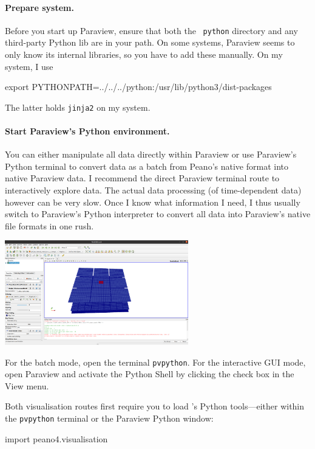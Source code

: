 \paragraph{Prepare system.}
%
%
Before you start up Paraview, ensure that both the \Peano\ \texttt{python}
directory and any third-party Python lib are in your path. 
On some systems, Paraview seems to
only know its internal libraries, so you have to add these manually. On my
system, I use
  \begin{code}
export PYTHONPATH=../../../python:/usr/lib/python3/dist-packages  
  \end{code}
The latter holds \texttt{jinja2} on my system.


\paragraph{Start Paraview's Python environment.}
%
%
You can either manipulate all data directly within Paraview or use Paraview's Python 
terminal to convert data as a batch from Peano's native format into native Paraview data.
I recommend the direct Paraview terminal route to interactively explore data.
The actual data processing (of time-dependent data) however can be very slow.
Once I know what information I need, I thus usually switch to Paraview's Python interpreter 
to convert all data into Paraview's native file formats in one rush.


\begin{center}
 \includegraphics[width=0.6\textwidth]{80_postprocessing/paraview.png}
\end{center}


For the batch mode, open the terminal \texttt{pvpython}.
For the interactive GUI mode, open Paraview and activate the Python Shell by clicking the check box in
the View menu.


Both visualisation routes first require you to load \Peano's Python tools---either
within the \texttt{pvpython} terminal or the Paraview Python window:
\begin{code}
import peano4.visualisation  
\end{code}


